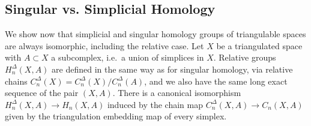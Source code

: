\documentclass[english,letterpaper]{article}%
\numberwithin{equation}{section}
\numberwithin{figure}{section}
\numberwithin{table}{section}
\theoremstyle{definition}
\theoremstyle{definition}
\theoremstyle{definition}
\theoremstyle{plain}
\theoremstyle{plain}
\theoremstyle{plain}
\theoremstyle{plain}
\theoremstyle{remark}
\theoremstyle{remark}
\begin{document}
\subsection{Singular vs. Simplicial Homology}

We show now that simplicial and singular homology groups of triangulable spaces are always isomorphic, including the relative case. Let $X$ be a triangulated space with $A\subset X$ a subcomplex, i.e.\ a union of simplices in $X$. Relative groups $H^{\Delta}_n(X,A)$ are defined in the same way as for singular homology, via relative chains $C^\Delta_n(X)=C^\Delta_n(X)/C^\Delta_n(A)$, and we also have the same long exact sequence of the pair $(X,A)$. There is a canonical isomorphism $H^\Delta_n(X,A)\to H_n(X,A)$ induced by the chain map $C_n^\Delta(X,A)\to C_n(X,A)$ given by the triangulation embedding map of every simplex. 
\end{document}
